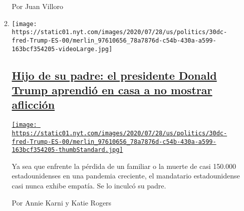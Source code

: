 \begin{enumerate}
\begin{enumerate}
    Por Juan Villoro
  \item
    \texttt{[image: https://static01.nyt.com/images/2020/07/28/us/politics/30dc-fred-Trump-ES-00/merlin\_97610656\_78a7876d-c54b-430a-a599-163bcf354205-videoLarge.jpg]}

    \hypertarget{hijo-de-su-padre-el-presidente-donald-trump-aprendiuxf3-en-casa-a-no-mostrar-aflicciuxf3n}{%
    \subsection{\texorpdfstring{\href{/es/2020/07/31/espanol/estados-unidos/fred-trump-donald-trump.html}{Hijo
    de su padre: el presidente Donald Trump aprendió en casa a no
    mostrar
    aflicción}}{Hijo de su padre: el presidente Donald Trump aprendió en casa a no mostrar aflicción}}\label{hijo-de-su-padre-el-presidente-donald-trump-aprendiuxf3-en-casa-a-no-mostrar-aflicciuxf3n}}

    \href{/es/2020/07/31/espanol/estados-unidos/fred-trump-donald-trump.html}{\texttt{[image: https://static01.nyt.com/images/2020/07/28/us/politics/30dc-fred-Trump-ES-00/merlin\_97610656\_78a7876d-c54b-430a-a599-163bcf354205-thumbStandard.jpg]}}

    Ya sea que enfrente la pérdida de un familiar o la muerte de casi
    150.000 estadounidenses en una pandemia creciente, el mandatario
    estadounidense casi nunca exhibe empatía. Se lo inculcó su padre.

    Por Annie Karni y Katie Rogers
  \end{enumerate}
\end{enumerate}


